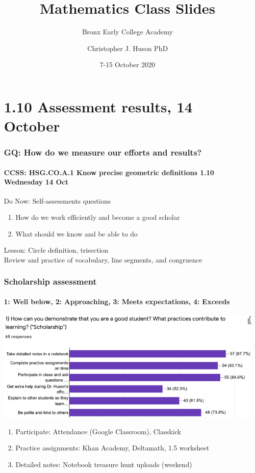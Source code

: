 \documentclass{beamer}
\title{Mathematics Class Slides}
\subtitle{Bronx Early College Academy}
\author{Christopher J. Huson PhD}
\date{7-15 October 2020}
\begin{document}
\frame{\titlepage}
\section[Outline]{}
\frame{\tableofcontents}

\section{1.10 Assessment results, 14 October}
  \frame
  {
    \frametitle{GQ: How do we measure our efforts and results?}
    \framesubtitle{CCSS: HSG.CO.A.1 Know precise geometric definitions  \hfill \alert{1.10 Wednesday 14 Oct}}
  
    \begin{block}{Do Now: Self-assessments questions}
    \begin{enumerate}
        \item How do we work efficiently and become a good scholar
        \item What should we know and be able to do
    \end{enumerate}
    \end{block}
    Lesson: Circle definition, trisection \\
    Review and practice of vocabulary, line segments, and congruence
  }

  \frame
  {
    \frametitle{Scholarship assessment}
    \framesubtitle{1: Well below, 2: Approaching, 3: Meets expectations, 4: Exceeds}
  \includegraphics[width=.95\textwidth]{scholarship-bar-chart.png}
    \begin{enumerate}
      \item Participate: Attendance (Google Classroom), Classkick
      \item Practice assignments: Khan Academy, Deltamath, 1.5 worksheet
      \item Detailed notes: Notebook treasure hunt uploads (weekend)
    \end{enumerate}
  }
\end{document}
